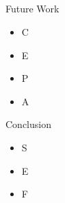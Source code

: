\documentclass[handout]{beamer}
\begin{document}
\subsection{}
\begin{frame}{Future Work}
\begin{itemize}[<+->]
	\item C
	\item E
	\item P
	\item A
\end{itemize}
\end{frame}


\begin{frame}{Conclusion}
\begin{itemize}[<+->]
	\item S
	\item E
	\item F
\end{itemize}

\end{frame}
\end{document}
